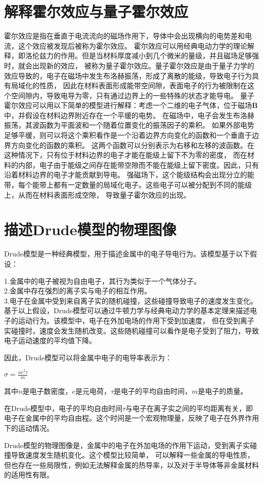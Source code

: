 \documentclass[12pt, a4paper, oneside]{ctexart}
\begin{document}
\begin{spacing}{2.0}
\section{解释霍尔效应与量子霍尔效应}
霍尔效应是指在垂直于电流流向的磁场作用下，导体中会出现横向的电势差和电流，这个效应被发现后被称为霍尔效应。
霍尔效应可以用经典电动力学的理论解释，即洛伦兹力的作用。但是当材料厚度减小到几个微米的量级，并且磁场足够强时，就会出现新的效应，
被称为量子霍尔效应。量子霍尔效应是由于量子力学的效应导致的，电子在磁场中发生布洛赫振荡，形成了离散的能级，导致电子行为具有局域化的性质，
因此在材料表面形成能带空间隙，表面电子的行为被限制在这个空间隙内，导致电导为零，只有通过边界上的一些特殊的状态才能导电。
量子霍尔效应可以用以下简单的模型进行解释：考虑一个二维的电子气体，位于磁场$\mathbf{B}$中，并假设在材料边界附近存在一个平缓的电势。
在磁场中，电子会发生布洛赫振荡，其波函数为平面波和一个随着位置变化的振荡因子的乘积。
如果外部电势足够平缓，则可以将这个乘积看作是一个沿着边界方向变化的函数和一个垂直于边界方向变化的函数的乘积。
这两个函数可以分别表示为右移和左移的波函数。在这种情况下，只有位于材料边界的电子才能在能级上留下不为零的密度，
而在材料的内部，电子由于能级之间存在能带空隙而不能在能级上留下密度。因此，只有沿着材料边界的电子才能贡献到导电。
强磁场下，这个能级结构会出现分立的能带，每个能带上都有一定数量的局域化电子。这些电子可以被分配到不同的能级上，从而在材料表面形成空隙，
导致量子霍尔效应的出现。
\section{描述Drude模型的物理图像}
Drude模型是一种经典模型，用于描述金属中的电子导电行为。该模型基于以下假设：

1.金属中的电子被视为自由电子，其行为类似于一个气体分子。\\

2.金属中存在强烈的离子实与电子的相互作用。\\

3.电子在金属中受到来自离子实的随机碰撞，这些碰撞导致电子的速度发生变化。\\

基于以上假设，Drude模型可以通过牛顿力学与经典电动力学的基本定理来描述电子的运动行为。该模型中，电子在外加电场的作用下受到加速度，
但在受到离子实碰撞时，速度会发生随机改变。这些随机碰撞可以看作是电子受到了阻力，导致电子运动速度的平均值下降。

因此，Drude模型可以将金属中电子的电导率表示为：
\begin{center}
    $\sigma = \frac{n e^2 \tau}{m}$
\end{center}
其中$n$是电子数密度，$e$是元电荷，$\tau$是电子的平均自由时间，$m$是电子的质量。

在Drude模型中，电子的平均自由时间$\tau$与电子在离子实之间的平均距离有关，即电子在金属中的平均自由程。这个时间是一个宏观物理量，反映了电子在外界作用下的运动情况。

Drude模型的物理图像是，金属中的电子在外加电场的作用下运动，受到离子实碰撞导致速度发生随机变化。这个模型比较简单，
可以解释一些金属的导电性质，但也存在一些局限性，例如无法解释金属的热导率，以及对于半导体等非金属材料的适用性有限。

\end{spacing}{}



\end{document}
